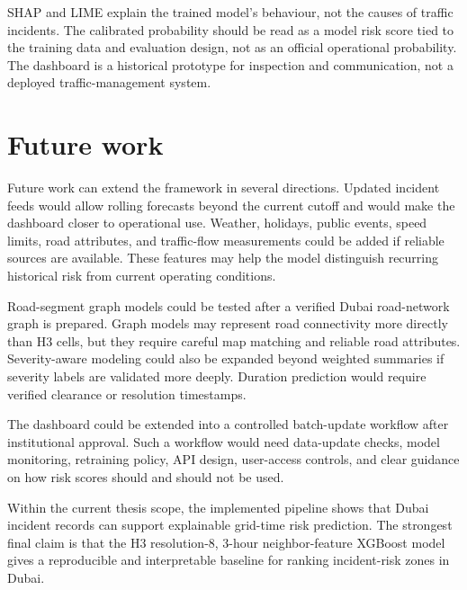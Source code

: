 SHAP and LIME explain the trained model's behaviour, not the causes of traffic incidents. The calibrated probability should be read as a model risk score tied to the training data and evaluation design, not as an official operational probability. The dashboard is a historical prototype for inspection and communication, not a deployed traffic-management system.

\section{Future work}

Future work can extend the framework in several directions. Updated incident feeds would allow rolling forecasts beyond the current cutoff and would make the dashboard closer to operational use. Weather, holidays, public events, speed limits, road attributes, and traffic-flow measurements could be added if reliable sources are available. These features may help the model distinguish recurring historical risk from current operating conditions.

Road-segment graph models could be tested after a verified Dubai road-network graph is prepared. Graph models may represent road connectivity more directly than H3 cells, but they require careful map matching and reliable road attributes. Severity-aware modeling could also be expanded beyond weighted summaries if severity labels are validated more deeply. Duration prediction would require verified clearance or resolution timestamps.

The dashboard could be extended into a controlled batch-update workflow after institutional approval. Such a workflow would need data-update checks, model monitoring, retraining policy, API design, user-access controls, and clear guidance on how risk scores should and should not be used.

Within the current thesis scope, the implemented pipeline shows that Dubai incident records can support explainable grid-time risk prediction. The strongest final claim is that the H3 resolution-8, 3-hour neighbor-feature XGBoost model gives a reproducible and interpretable baseline for ranking incident-risk zones in Dubai.
